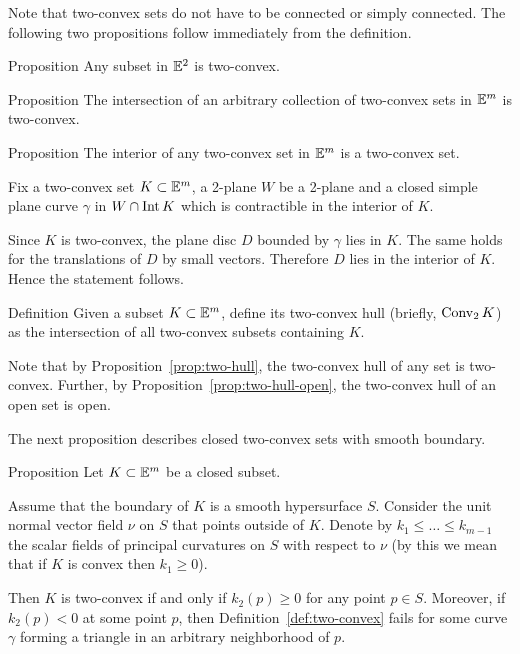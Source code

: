 Note that two-convex sets do not have to be connected or simply connected. 
The following two propositions follow immediately from the definition.

\begin{thm}{Proposition}
Any subset in $\mathbb{E}^2$ is two-convex.
\end{thm}


\begin{thm}{Proposition}\label{prop:two-hull}
The intersection of an arbitrary collection of two-convex sets in $\mathbb{E}^m$ is two-convex.
\end{thm}

\begin{thm}{Proposition}\label{prop:two-hull-open}
The interior of any two-convex set in $\mathbb{E}^m$ is a two-convex set.
\end{thm}

Fix a  two-convex set $K\subset \EE^m$, a 2-plane $W$ be a 2-plane and a closed simple plane curve $\gamma$ in $W\cap \Int K$ 
which is contractible in the interior of $K$.

Since $K$ is two-convex,
the plane disc $D$ bounded by $\gamma$ lies in $K$.
The same holds for the translations of $D$ by small vectors.
Therefore $D$ lies in the interior of $K$.
Hence the statement follows.
\qeds

\begin{thm}{Definition}
Given a subset $K\subset \EE^m$, define its two-convex hull (briefly, $\mathop{\rm Conv}\nolimits_2K$) as the intersection of all two-convex subsets containing $K$.
\end{thm}

Note that by Proposition~\ref{prop:two-hull},
the two-convex hull of any set is two-convex.
Further, 
by Proposition~\ref{prop:two-hull-open}, the
two-convex hull of an open set is open.

The next proposition describes  closed two-convex sets with smooth boundary.

\begin{thm}{Proposition}\label{prop:two-cove+smooth}
Let $K\subset \EE^m$ be a closed subset.

Assume that the boundary of $K$ is a smooth hypersurface $S$.
Consider the unit normal vector field $\nu$ on $S$ that  points outside of $K$.
Denote by $k_1\le \dots\le k_{m-1}$ the scalar fields of principal curvatures on $S$ with respect to $\nu$ (by this we mean that  if $K$ is convex then  $k_1\ge 0$).

Then $K$ is two-convex if and only if $k_2(p)\ge 0$ for any point $p\in S$.
Moreover, if $k_2(p)<0$ at some point $p$, then Definition~\ref{def:two-convex} fails for some curve $\gamma$ forming a triangle in an arbitrary neighborhood of $p$.
\end{thm}

